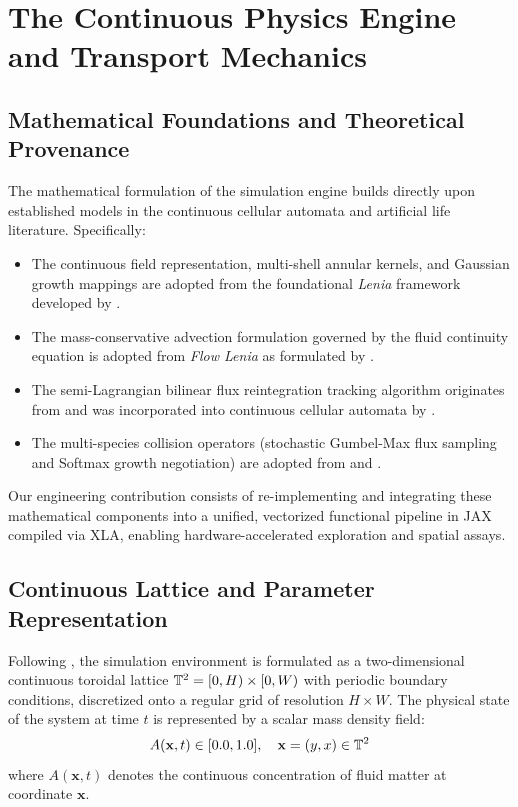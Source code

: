 \section{The Continuous Physics Engine and Transport Mechanics}
\label{sec:model_and_physics}

\subsection{Mathematical Foundations and Theoretical Provenance}
\label{subsec:model_provenance}

The mathematical formulation of the simulation engine builds directly upon established models in the continuous cellular automata and artificial life literature. Specifically:
\begin{itemize}
    \item The continuous field representation, multi-shell annular kernels, and Gaussian growth mappings are adopted from the foundational \textit{Lenia} framework developed by \textcite{chan2019lenia, chan2020lenia}.
    \item The mass-conservative advection formulation governed by the fluid continuity equation is adopted from \textit{Flow Lenia} as formulated by \textcite{plantec2025flowlenia}.
    \item The semi-Lagrangian bilinear flux reintegration tracking algorithm originates from \textcite{moroz2020reintegration} and was incorporated into continuous cellular automata by \textcite{plantec2025flowlenia}.
    \item The multi-species collision operators (stochastic Gumbel-Max flux sampling and Softmax growth negotiation) are adopted from \textcite{plantec2025flowlenia} and \textcite{michel2025exploring}.
\end{itemize}
Our engineering contribution consists of re-implementing and integrating these mathematical components into a unified, vectorized functional pipeline in JAX compiled via XLA, enabling hardware-accelerated exploration and spatial assays.

\subsection{Continuous Lattice and Parameter Representation}
\label{subsec:model_lattice_parameters}

Following \textcite{plantec2025flowlenia}, the simulation environment is formulated as a two-dimensional continuous toroidal lattice $\mathbb{T}^2 = [0, H) \times [0, W)$ with periodic boundary conditions, discretized onto a regular grid of resolution $H \times W$. The physical state of the system at time $t$ is represented by a scalar mass density field:
\begin{equation}
A(\mathbf{x}, t) \in [0.0, 1.0], \quad \mathbf{x} = (y, x) \in \mathbb{T}^2
\label{eq:mass_density_field}
\end{equation}
where $A(\mathbf{x}, t)$ denotes the continuous concentration of fluid matter at coordinate $\mathbf{x}$.

